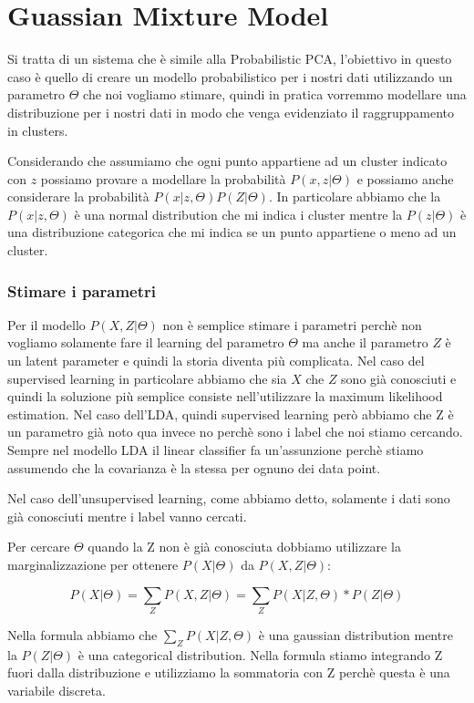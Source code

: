 \documentclass[14pt]{extreport}
\begin{document}
\section{Guassian Mixture Model}

Si tratta di un sistema che è simile alla Probabilistic PCA, l'obiettivo in questo caso è quello di creare un modello probabilistico per i nostri dati 
utilizzando un parametro $\Theta$ che noi vogliamo stimare, quindi in pratica vorremmo modellare una distribuzione per i nostri dati in modo che venga 
evidenziato il raggruppamento in clusters.

Considerando che assumiamo che ogni punto appartiene ad un cluster indicato con $z$ possiamo provare a modellare la probabilità $P(x,z | \Theta)$ e possiamo anche considerare
la probabilità $P(x|z,\Theta)P(Z|\Theta)$.
In particolare abbiamo che la $P(x|z,\Theta)$ è una normal distribution che mi indica i cluster mentre la $P(z|\Theta)$ è una distribuzione categorica 
che mi indica se un punto appartiene o meno ad un cluster.

\subsubsection{Stimare i parametri}

Per il modello $P(X, Z | \Theta)$ non è semplice stimare i parametri perchè non vogliamo solamente fare il learning del parametro $\Theta$ ma anche il parametro 
$Z$ è un latent parameter e quindi la storia diventa più complicata.
Nel caso del supervised learning in particolare abbiamo che sia $X$ che $Z$ sono già conosciuti e quindi la soluzione più semplice consiste nell'utilizzare la 
maximum likelihood estimation. Nel caso dell'LDA, quindi supervised learning però abbiamo che Z è un parametro già noto qua invece no perchè sono i label che noi stiamo cercando.
Sempre nel modello LDA il linear classifier fa un'assunzione perchè stiamo assumendo che la covarianza è la stessa per ognuno dei data point.

Nel caso dell'unsupervised learning, come abbiamo detto, solamente i dati sono già conosciuti mentre i label vanno cercati.

Per cercare $\Theta$ quando la Z non è già conosciuta dobbiamo utilizzare la marginalizzazione per ottenere $P(X|\Theta)$ da $P(X,Z|\Theta)$:

$$ P(X | \Theta ) = \sum_{Z}{P(X , Z | \Theta )} = \sum_{Z} P(X | Z, \Theta ) * P( Z | \Theta) $$

Nella formula abbiamo che $\sum_{Z} P(X | Z, \Theta)$ è una gaussian distribution mentre la $P(Z | \Theta)$ è una categorical distribution.
Nella formula stiamo integrando Z fuori dalla distribuzione e utilizziamo la sommatoria con Z perchè questa è una variabile discreta.
\end{document}

